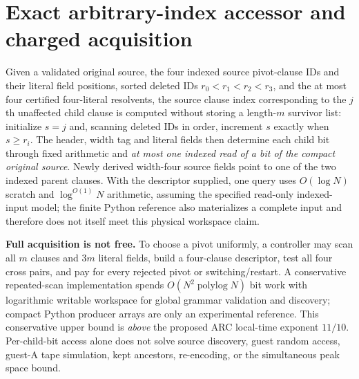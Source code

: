 \documentclass[10pt]{article}
\begin{document}
\section{Exact arbitrary-index accessor and charged acquisition}
Given a validated original source, the four indexed source pivot-clause IDs and their literal field positions, sorted deleted IDs $r_0<r_1<r_2<r_3$, and the at most four certified four-literal resolvents, the source clause index corresponding to the $j$th unaffected child clause is computed without storing a length-$m$ survivor list: initialize $s=j$ and, scanning deleted IDs in order, increment $s$ exactly when $s\ge r_i$. The header, width tag and literal fields then determine each child bit through fixed arithmetic and \emph{at most one indexed read of a bit of the compact original source}. Newly derived width-four source fields point to one of the two indexed parent clauses. With the descriptor supplied, one query uses $O(\log N)$ scratch and $\log^{O(1)}N$ arithmetic, assuming the specified read-only indexed-input model; the finite Python reference also materializes a complete input and therefore does not itself meet this physical workspace claim.

\noindent\textbf{Full acquisition is not free.} To choose a pivot uniformly, a controller may scan all $m$ clauses and $3m$ literal fields, build a four-clause descriptor, test all four cross pairs, and pay for every rejected pivot or switching/restart. A conservative repeated-scan implementation spends $O(N^2\operatorname{polylog}N)$ bit work with logarithmic writable workspace for global grammar validation and discovery; compact Python producer arrays are only an experimental reference. This conservative upper bound is \emph{above} the proposed ARC local-time exponent $11/10$. Per-child-bit access alone does not solve source discovery, guest random access, guest-A tape simulation, kept ancestors, re-encoding, or the simultaneous peak space bound.
\end{document}
